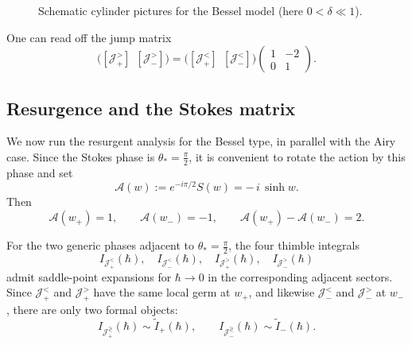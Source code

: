 \documentclass[11pt]{amsart}
\theoremstyle{plain}
\newcommand{\J}{\mathcal J}
\begin{document}
\begin{figure}[H]

\caption{Schematic cylinder pictures for the Bessel model (here \(0<\delta\ll 1\)).}
\label{fig:bessel-cylinder-stokes-schematic}
\end{figure}




One can read off the jump matrix
\begin{equation}\label{equ:Besseljump}
\bigl([\J_+^>] \ \ [\J_-^>]\bigr)
=
\bigl([\J_+^<] \ \ [\J_-^<]\bigr)
\begin{pmatrix}
1&-2\\
0&1
\end{pmatrix}.
\end{equation}

\smallskip
\subsection{Resurgence and the Stokes matrix}

We now run the resurgent analysis for the Bessel type, in parallel with the Airy case.
Since the Stokes phase is \(\theta_*=\frac{\pi}{2}\), it is convenient to rotate the action by this phase and set
\[
\mathcal A(w):=e^{-i\pi/2}S(w)=-\,i\,\sinh w.
\]
Then
\[
\mathcal A(w_+)=1,\qquad \mathcal A(w_-)=-1,
\qquad
\mathcal A(w_+)-\mathcal A(w_-)=2.
\]

For the two generic phases adjacent to \(\theta_*=\frac{\pi}{2}\), the four thimble integrals
\[
I_{\J_+^{<}}(\hbar),\quad I_{\J_-^{<}}(\hbar),\quad I_{\J_+^{>}}(\hbar),\quad I_{\J_-^{>}}(\hbar)
\]
admit saddle-point expansions for \(\hbar\to0\) in the corresponding adjacent sectors. Since
\(\J_+^{<}\) and \(\J_+^{>}\) have the same local germ at \(w_+\), and likewise
\(\J_-^{<}\) and \(\J_-^{>}\) at \(w_-\), there are only two formal objects:
\[
I_{\J_+^{\gtrless}}(\hbar)\sim \widetilde I_+(\hbar),
\qquad
I_{\J_-^{\gtrless}}(\hbar)\sim \widetilde I_-(\hbar).
\]
\end{document}
